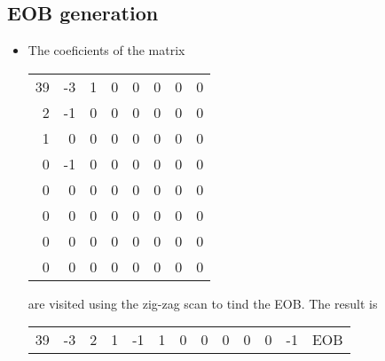 \subsection*{EOB generation}
\begin{itemize}
  \item The coeficients of the matrix
    \begin{center}
      \begin{tabular}{|rrrrrrrr|}
        \hline
        39 & -3 & 1 & 0 & 0 & 0 & 0 & 0 \\
        2 & -1 & 0 & 0 & 0 & 0 & 0 & 0 \\
        1 & 0 & 0 & 0 & 0 & 0 & 0 & 0 \\
        0 & -1 & 0 & 0 & 0 & 0 & 0 & 0 \\
        0 & 0 & 0 & 0 & 0 & 0 & 0 & 0 \\
        0 & 0 & 0 & 0 & 0 & 0 & 0 & 0 \\
        0 & 0 & 0 & 0 & 0 & 0 & 0 & 0 \\
        0 & 0 & 0 & 0 & 0 & 0 & 0 & 0 \\
        \hline
      \end{tabular}
    \end{center}
    are visited using the zig-zag scan to tind the EOB. The result is
  \begin{center}
    \begin{tabular}{ccccccccccccc}
      39 & -3 & 2 & 1 & -1 & 1 & 0 & 0 & 0 & 0 & 0 & -1 & EOB
    \end{tabular}
  \end{center}
\end{itemize}

